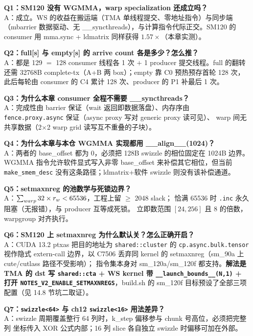 \textbf{Q1：SM120 没有 WGMMA，warp specialization 还成立吗？}\\
A：成立。WS 的收益在搬运端（TMA 单线程提交、零地址指令）与同步端
（mbarrier 数据驱动、无 \_\_syncthreads），与计算指令代际正交。SM120 的
consumer 用 mma.sync + ldmatrix 同样获得 $1.57\times$（本章实测）。

\textbf{Q2：full[s] 与 empty[s] 的 arrive count 各是多少？怎么推？}\\
A：都是 129 $=$ 128 consumer 线程各 1 次 $+$ 1 producer 提交线程。full 的翻转
还需 32768B complete-tx（A+B 两 box）；empty 靠 C0 预热预存首轮 128 次，
此后每轮由 consumer 的 C4 累计 128 次、producer 的 P1 补最后 1 次。

\textbf{Q3：为什么本章 consumer 全程不需要 \_\_syncthreads？}\\
A：完成性由 barrier 保证（wait 返回即数据落盘）、内存序由
\texttt{fence.\allowbreak{}proxy.\allowbreak{}async} 保证（async proxy 写对 generic proxy 读可见）、
warp 间无共享数据（2$\times$2 warp grid 读写互不重叠的子块）。

\textbf{Q4：为什么本章与本仓 WGMMA 实现都用 \_\_align\_\_(1024)？}\\
A：两者的 base\_offset 都为 0，必须把 128B swizzle 的相位固定在 1024B 边界。
WGMMA 指令允许软件显式写入非零 base\_offset 来补偿其它相位，但当前
\texttt{make\_\allowbreak{}smem\_\allowbreak{}desc} 没有这条路径；ldmatrix+软件 swizzle
则没有该补偿通道。

\textbf{Q5：setmaxnreg 的池数学与死锁边界？}\\
A：$\sum\sb{warp} 32 \times r\sb{w} < 65536$，工程上留 $\ge$ 2048 slack；
恰满 65536 时 \texttt{.inc} 永久阻塞（无报错），与 producer 互等成死锁。
立即数范围 $[24, 256]$ 且 8 的倍数，warpgroup 对齐执行。

\textbf{Q6：SM120 上 setmaxnreg 为什么默认关？怎么正确开启？}\\
A：CUDA 13.2 ptxas 把目的地址为 \texttt{shared::cluster} 的
\texttt{cp.\allowbreak{}async.\allowbreak{}bulk.\allowbreak{}tensor} 视作隐式 extern-call 边界，以 C7506
丢弃同 kernel 的 setmaxnreg（sm\_90a 上 cute/cutlass 路径不受影响）；
指令集本身对 sm\_120a/sm\_120f 都支持。\textbf{解法是 TMA 的 dst 写
\texttt{shared::cta} + WS kernel 带
\texttt{\_\_launch\_bounds\_\_(N,1)} + 打开
\texttt{NOTES\_\allowbreak{}V2\_\allowbreak{}ENABLE\_\allowbreak{}SETMAXNREGS}}，build.sh 的 sm\_120f
目标预设了全部三项配置（见 14.8 节坑二取证）。

\textbf{Q7：\texttt{swizzle<64>} 与 ch12 \texttt{swizzle<16>} 用法差异？}\\
A：swizzle 周期覆盖整行 64 列时，k\_step 偏移参与 chunk 号高位，必须把完整列
坐标传入 XOR 公式内部；16 列 slice 各自独立 swizzle 时偏移可加在外部。

